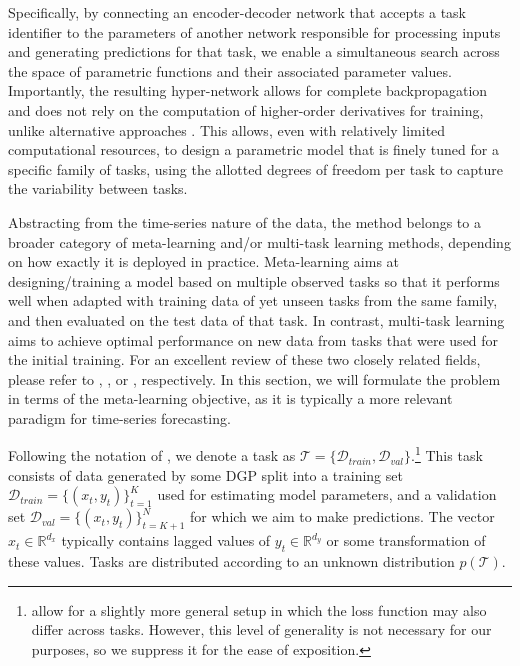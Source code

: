 \documentclass[3p,times,twocolumn]{elsarticle}
\begin{document}
Specifically, by connecting an encoder-decoder network that accepts a task identifier to the parameters of another network responsible for processing inputs and generating predictions for that task, we enable a simultaneous search across the space of parametric functions and their associated parameter values.
Importantly, the resulting hyper-network allows for complete backpropagation and does not rely on the computation of higher-order derivatives for training, unlike alternative approaches \citep[see, e.g.,][]{finnModelAgnosticMetaLearningFast2017,liMetaSGDLearningLearn2017}.
This allows, even with relatively limited computational resources, to design a parametric model that is finely tuned for a specific family of tasks, using the allotted degrees of freedom per task to capture the variability between tasks.

Abstracting from the time-series nature of the data, the method belongs to a broader category of meta-learning and/or multi-task learning methods, depending on how exactly it is deployed in practice.
Meta-learning aims at designing/training a model based on multiple observed tasks so that it performs well when adapted with training data of yet unseen tasks from the same family, and then evaluated on the test data of that task.
In contrast, multi-task learning aims to achieve optimal performance on new data from tasks that were used for the initial training.
For an excellent review of these two closely related fields, please refer to \citet{hospedalesMetalearningNeuralNetworks2021}, \citet{huismanSurveyDeepMetalearning2021}, or \citet{zhangSurveyMultiTaskLearning2022}, respectively.
In this section, we will formulate the problem in terms of the meta-learning objective, as it is typically a more relevant paradigm for time-series forecasting.

Following the notation of \citet{hospedalesMetalearningNeuralNetworks2021}, we denote a task as $ \mathcal{T} = \{ \mathcal{D}_{train}, \mathcal{D}_{val} \}$.\footnote{
    \citet{hospedalesMetalearningNeuralNetworks2021} allow for a slightly more general setup in which the loss function may also differ across tasks. 
    However, this level of generality is not necessary for our purposes, so we suppress it for the ease of exposition.
}
This task consists of data generated by some DGP split into a training set $\mathcal{D}_{train} = \{ (x_{t}, y_{t})\}_{t=1}^{K}$ used for estimating model parameters, and a validation set $\mathcal{D}_{val} = \{ (x_{t}, y_{t})\}_{t=K+1}^{N}$ for which we aim to make predictions. 
The vector $x_{t}\in \mathbb{R}^{d_{x}}$ typically contains lagged values of $y_{t} \in \mathbb{R}^{d_{y}}$ or some transformation of these values.
Tasks are distributed according to an unknown distribution $p(\mathcal{T})$.
\end{document}
